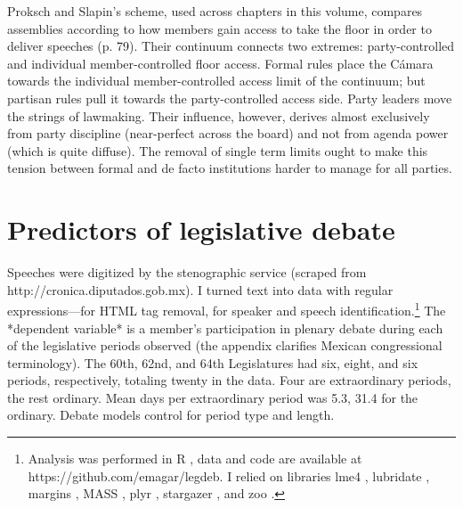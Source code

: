 \documentclass[letter,12pt]{article}
\begin{document}
Proksch and Slapin's \citeyearpar{proksch-slapin2015book} scheme, used across chapters in this volume, compares assemblies according to how members gain access to take the floor in order to deliver speeches (p. 79). Their continuum connects two extremes: party-controlled and individual member-controlled floor access. Formal rules place the Cámara towards the individual member-controlled access limit of the continuum; but partisan rules pull it towards the party-controlled access side. Party leaders move the strings of lawmaking. Their influence, however, derives almost exclusively from party discipline (near-perfect across the board) and not from agenda power (which is quite diffuse). The removal of single term limits ought to make this tension between formal and de facto institutions harder to manage for all parties.  

\section{Predictors of legislative debate} %
 


Speeches were digitized by the stenographic service (scraped from http://cronica.diputados.gob.mx). I turned text into data with regular expressions---for HTML tag removal, for speaker and speech identification.\footnote{Analysis was performed in R \citep{r.cite}, data and code are available at https://github.com/emagar/legdeb. I relied on libraries lme4 \citep{r.lme4}, lubridate \citep{r.lubridate}, margins \citep{r.margins}, MASS \citep{r.mass}, plyr \citep{r.plyr}, stargazer \citep{r.stargazer}, and zoo \citep{r.zoo}.} The *dependent variable* is a member's participation in plenary debate during each of the legislative periods observed (the appendix clarifies Mexican congressional terminology). The 60th, 62nd, and 64th Legislatures had six, eight, and six periods, respectively, totaling twenty in the data. Four are extraordinary periods, the rest ordinary. Mean days per extraordinary period was 5.3, 31.4 for the ordinary. Debate models control for period type and length. 
\end{document}
